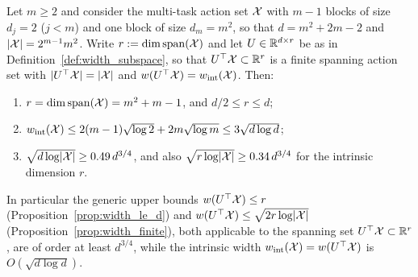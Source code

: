 \begin{theorem}\label{thm:width_separation}
\leanok
{}
Let $m \ge 2$ and consider the multi-task action set $\mathcal{X}$ with $m-1$ blocks of size
$d_j = 2$ ($j < m$) and one block of size $d_m = m^2$, so that $d = m^2 + 2m - 2$ and
$\lvert \mathcal{X} \rvert = 2^{m-1}m^2$. Write $r := \dim\operatorname{span}(\mathcal{X})$ and let $U \in \mathbb{R}^{d\times r}$ be as in
Definition~\ref{def:width_subspace}, so that $U^\top\mathcal{X} \subset \mathbb{R}^r$ is a finite spanning
action set with $\lvert U^\top\mathcal{X} \rvert = \lvert \mathcal{X} \rvert$ and $w(U^\top\mathcal{X}) = w_{\mathrm{int}}(\mathcal{X})$. Then:
\begin{enumerate}
  \item[(i)] $r = \dim\operatorname{span}(\mathcal{X}) = m^2 + m - 1$, and $d/2 \le r \le d$;
  \item[(ii)] $w_{\mathrm{int}}(\mathcal{X}) \le 2(m-1)\sqrt{\log 2} + 2m\sqrt{\log m} \le 3\sqrt{d\log d}$;
  \item[(iii)] $\sqrt{d\log\lvert \mathcal{X} \rvert} \ge 0.49\, d^{3/4}$, and also
        $\sqrt{r\log\lvert \mathcal{X} \rvert} \ge 0.34\,d^{3/4}$ for the intrinsic dimension $r$.
\end{enumerate}
In particular the generic upper bounds $w(U^\top\mathcal{X}) \le r$
(Proposition~\ref{prop:width_le_d}) and $w(U^\top\mathcal{X}) \le \sqrt{2r\log\lvert \mathcal{X} \rvert}$
(Proposition~\ref{prop:width_finite}), both applicable to the spanning set
$U^\top\mathcal{X} \subset \mathbb{R}^r$, are of order at least $d^{3/4}$, while the intrinsic width
$w_{\mathrm{int}}(\mathcal{X}) = w(U^\top\mathcal{X})$ is $O(\sqrt{d\log d})$.
\end{theorem}

